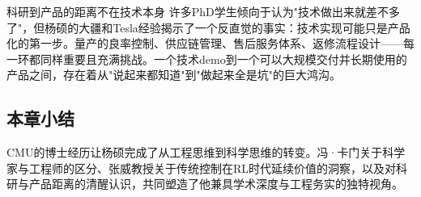 \begin{warningbox}{科研到产品的距离不在技术本身}
许多PhD学生倾向于认为"技术做出来就差不多了"，但杨硕的大疆和Tesla经验揭示了一个反直觉的事实：技术实现可能只是产品化的第一步。量产的良率控制、供应链管理、售后服务体系、返修流程设计——每一环都同样重要且充满挑战。一个技术demo到一个可以大规模交付并长期使用的产品之间，存在着从"说起来都知道"到"做起来全是坑"的巨大鸿沟。
\end{warningbox}

\subsection{本章小结}

CMU的博士经历让杨硕完成了从工程思维到科学思维的转变。冯·卡门关于科学家与工程师的区分、张威教授关于传统控制在RL时代延续价值的洞察，以及对科研与产品距离的清醒认识，共同塑造了他兼具学术深度与工程务实的独特视角。


